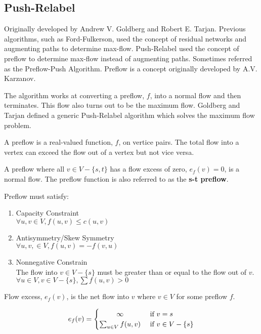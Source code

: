 
\subsection{Push-Relabel}
Originally developed by Andrew V. Goldberg and Robert E. Tarjan. Previous algorithms, such as Ford-Fulkerson, used the concept of residual networks and augmenting paths to determine max-flow.
Push-Relabel used the concept of preflow to determine  max-flow instead of augmenting paths. Sometimes referred as the Preflow-Push Algorithm.
Preflow is a concept originally developed by A.V. Karzanov.

The algorithm works at converting a preflow, $f$, into a normal flow and then terminates. This flow also turns out to be the maximum flow. Goldberg and Tarjan defined a generic Push-Relabel algorithm  which solves the maximum flow problem.

\begin{definition}[Preflow]
	A preflow is a real-valued function, $f$, on vertice pairs. The total flow into a vertex can exceed the flow out of a vertex but not vice versa.
\end{definition}
A preflow where all $v \in V-\{s, t\}$ has a flow excess of zero, $e_f(v) = 0$, is a normal flow. The preflow function is also referred to as the \textbf{s-t preflow}.

Preflow must satisfy:
\begin{enumerate}
	\item Capacity Constraint\\
	$\forall u,v \in V, f(u,v) \leq c(u,v)$
	
	\item Antisymmetry/Skew Symmetry\\
	$\forall u, v, \in V, f(u,v) = -f(v,u)$
	
	\item Nonnegative Constrain\\
	The flow into $v \in V-\{s\}$ must be greater than or equal to the flow out of $v$. $\forall u \in V, v \in V-\{s\}, \sum f(u,v)>0$
\end{enumerate}

\begin{definition}
	Flow excess, $e_f(v)$, is the net flow into $v$ where $v \in V$ for some preflow $f$.
\end{definition}

\[
e_f(v) =
\begin{cases} 
\hfill \infty \hfill & \text{ if $v=s$} \\
\hfill \sum_{u \in V}f(u,v) \hfill & \text{ if $v \in V-\{s\}$} \\
\end{cases}
\]

